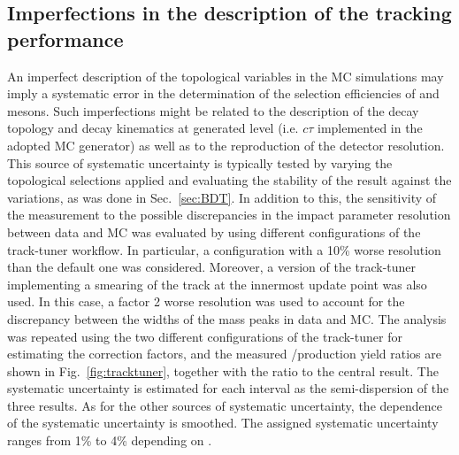 \subsection{Imperfections in the description of the tracking performance}
An imperfect description of the topological variables in the MC simulations may imply a systematic error in the determination of the selection efficiencies of \ds and \dpl mesons. Such imperfections might be related to the description of the decay topology and decay kinematics at generated level (i.e. $c\tau$ implemented in the adopted MC generator) as well as to the reproduction of the detector resolution. This source of systematic uncertainty is typically tested by varying the topological selections applied and evaluating the stability of the result against the variations, as was done in Sec.~\ref{sec:BDT}. In addition to this, the sensitivity of the measurement to the possible discrepancies in the impact parameter resolution between data and MC was evaluated by using different configurations of the track-tuner workflow. In particular, a configuration with a 10\% worse resolution than the default one was considered. Moreover, a version of the track-tuner implementing a smearing of the track \pt at the innermost update point was also used. In this case, a factor 2 worse \pt resolution was used to account for the discrepancy between the widths of the mass peaks in data and MC. The analysis was repeated using the two different configurations of the track-tuner for estimating the correction factors, and the measured \ds/\dpl production yield ratios are shown in Fig.~\ref{fig:tracktuner}, together with the ratio to the central result. The systematic uncertainty is estimated for each \pt interval as the semi-dispersion of the three results. As for the other sources of systematic uncertainty, the \pt dependence of the systematic uncertainty is smoothed. The assigned systematic uncertainty ranges from 1\% to 4\% depending on \pt.

